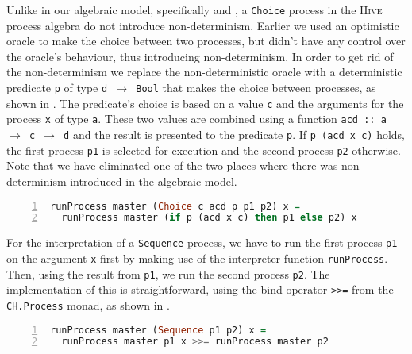 Unlike in our algebraic model, specifically  and , a \texttt{Choice} process in the \textsc{Hive} process algebra do not introduce non-determinism. Earlier we used an optimistic oracle to make the choice between two processes, but didn't have any control over the oracle's behaviour, thus introducing non-determinism. In order to get rid of the non-determinism we replace the non-deterministic oracle with a deterministic predicate \texttt{p} of type \texttt{d $\to$ Bool} that makes the choice between processes, as shown in . The predicate's choice is based on a value \texttt{c} and the arguments for the process \texttt{x} of type \texttt{a}. These two values are combined using a function \texttt{acd :: a $\to$ c $\to$ d} and the result is presented to the predicate \texttt{p}. If \texttt{p (acd x c)} holds, the first process \texttt{p1} is selected for execution and the second process \texttt{p2} otherwise. Note that we have eliminated one of the two places where there was non-determinism introduced in the algebraic model.  %
\begin{lstlisting}[language=Haskell,caption=Implementation of the interpreter for \texttt{Choice} processes.,label=lst:runprocess_choice,numbers=left,frame=bt]
runProcess master (Choice c acd p p1 p2) x =
  runProcess master (if p (acd x c) then p1 else p2) x
\end{lstlisting}

For the interpretation of a \texttt{Sequence} process, we have to run the first process \texttt{p1} on the argument \texttt{x} first by making use of the interpreter function \texttt{runProcess}. Then, using the result from \texttt{p1}, we run the second process \texttt{p2}. The implementation of this is straightforward, using the bind operator \texttt{>}\texttt{>=} from the \texttt{CH.Process} monad, as shown in .
\begin{lstlisting}[language=Haskell,caption=Implementation of the interpreter for \texttt{Sequence} processes.,label=lst:runprocess_sequence,numbers=left,frame=bt]
runProcess master (Sequence p1 p2) x =
  runProcess master p1 x >>= runProcess master p2
\end{lstlisting}

